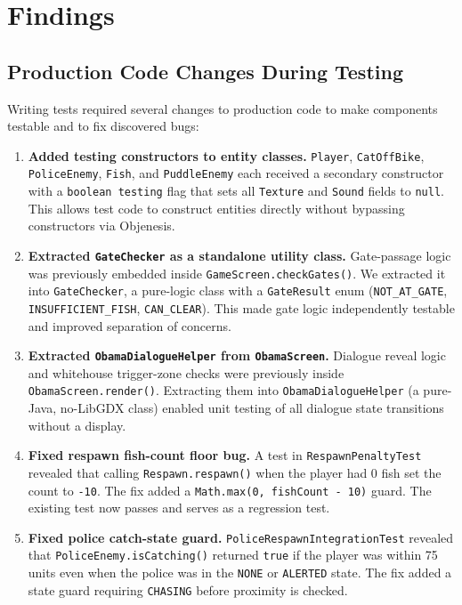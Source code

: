 \documentclass[12pt]{article}
\begin{document}
\section{Findings}
\label{sec:findings}

\subsection{Production Code Changes During Testing}

Writing tests required several changes to production code to make components testable and to fix discovered bugs:

\begin{enumerate}[itemsep=4pt]

  \item \textbf{Added testing constructors to entity classes.}
    \texttt{Player}, \texttt{CatOffBike}, \texttt{PoliceEnemy}, \texttt{Fish}, and \texttt{PuddleEnemy} each received a secondary constructor with a \texttt{boolean testing} flag that sets all \texttt{Texture} and \texttt{Sound} fields to \texttt{null}. This allows test code to construct entities directly without bypassing constructors via Objenesis.

  \item \textbf{Extracted \texttt{GateChecker} as a standalone utility class.}
    Gate-passage logic was previously embedded inside \texttt{GameScreen.checkGates()}. We extracted it into \texttt{GateChecker}, a pure-logic class with a \texttt{GateResult} enum (\texttt{NOT\_AT\_GATE}, \texttt{INSUFFICIENT\_FISH}, \texttt{CAN\_CLEAR}). This made gate logic independently testable and improved separation of concerns.

  \item \textbf{Extracted \texttt{ObamaDialogueHelper} from \texttt{ObamaScreen}.}
    Dialogue reveal logic and whitehouse trigger-zone checks were previously inside \texttt{ObamaScreen.render()}. Extracting them into \texttt{ObamaDialogueHelper} (a pure-Java, no-LibGDX class) enabled unit testing of all dialogue state transitions without a display.

  \item \textbf{Fixed respawn fish-count floor bug.}
    A test in \texttt{RespawnPenaltyTest} revealed that calling \texttt{Respawn.respawn()} when the player had 0 fish set the count to \texttt{-10}. The fix added a \texttt{Math.max(0, fishCount - 10)} guard. The existing test now passes and serves as a regression test.

  \item \textbf{Fixed police catch-state guard.}
    \texttt{PoliceRespawnIntegrationTest} revealed that \texttt{PoliceEnemy.isCatching()} returned \texttt{true} if the player was within 75 units even when the police was in the \texttt{NONE} or \texttt{ALERTED} state. The fix added a state guard requiring \texttt{CHASING} before proximity is checked.

\end{enumerate}
\end{document}
